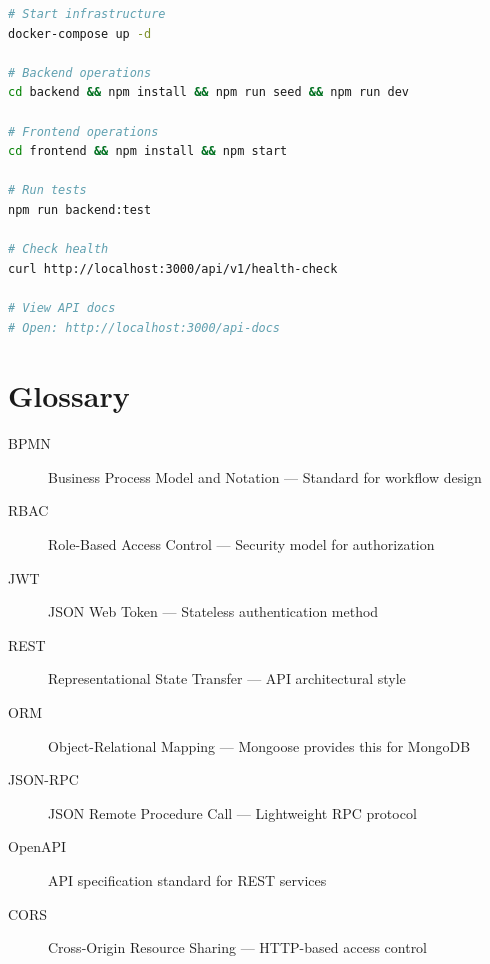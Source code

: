 \documentclass[11pt,a4paper,oneside,openany]{book}
\begin{document}
\noindent\begin{minipage}{\linewidth}
\begin{lstlisting}[language=bash,caption=Quick Reference Commands]
# Start infrastructure
docker-compose up -d

# Backend operations
cd backend && npm install && npm run seed && npm run dev

# Frontend operations
cd frontend && npm install && npm start

# Run tests
npm run backend:test

# Check health
curl http://localhost:3000/api/v1/health-check

# View API docs
# Open: http://localhost:3000/api-docs
\end{lstlisting}
\end{minipage}

\chapter{Glossary}

\begin{description}
    \item[BPMN] Business Process Model and Notation --- Standard for workflow design
    \item[RBAC] Role-Based Access Control --- Security model for authorization
    \item[JWT] JSON Web Token --- Stateless authentication method
    \item[REST] Representational State Transfer --- API architectural style
    \item[ORM] Object-Relational Mapping --- Mongoose provides this for MongoDB
    \item[JSON-RPC] JSON Remote Procedure Call --- Lightweight RPC protocol
    \item[OpenAPI] API specification standard for REST services
    \item[CORS] Cross-Origin Resource Sharing --- HTTP-based access control
\end{description}

\printindex
\end{document}
